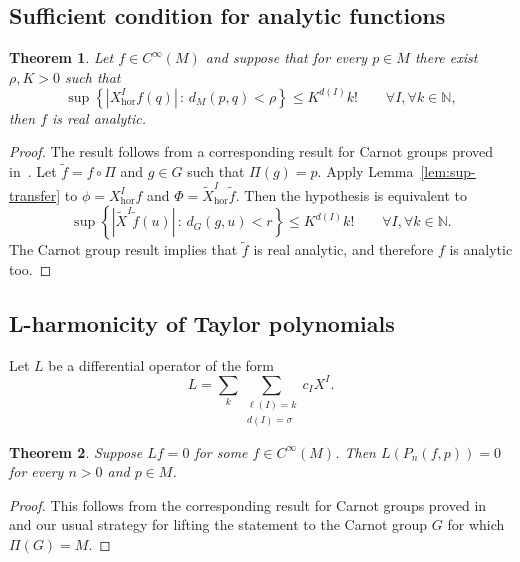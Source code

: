 \documentclass[12pt]{amsart}
\newtheorem{theorem}{Theorem}[section]
\begin{document}
\subsection{Sufficient condition for analytic functions}
\begin{theorem}
Let $f\in C^{\infty}(M)$ and suppose that for every $p\in M$ there exist $\rho,K>0$ such that
$$
\sup\left\{
|X_{\mathrm{hor}}^I f(q)|\,:\, d_M(p,q)<\rho
\right\}\leq K^{d(I)}k!\qquad \forall I,\forall k\in \mathbb N,
$$
then $f$ is real analytic.
\end{theorem}
\begin{proof}
 The result follows from a corresponding result for Carnot groups proved in~\cite{Bonfiglioli}.
       Let $\tilde f=f\circ\Pi$ and $g\in G$ such that $\Pi(g)=p$.
       Apply Lemma~\ref{lem:sup-transfer} to $\phi = X_{\mathrm{hor}}^I f$ and $\Phi = \tilde X_{\mathrm{hor}}^I \tilde f$.
      Then the hypothesis is equivalent to 
   $$
   \sup\left\{
|\tilde X^I \tilde f(u)|\,:\, d_G(g,u)<r
\right\}\leq K^{d(I)}k!\qquad \forall I,\forall k\in \mathbb N.
   $$
     The Carnot group result implies that $\tilde f$ is real analytic, and therefore $f$ is analytic too.
  
\end{proof}



\subsection{L-harmonicity of Taylor polynomials}
Let $L$ be a differential operator of the form
 $$
 L = \sum_{k} \sum_{\substack{\ell(I)=k\\d(I)=\sigma}} c_I  X^I.
 $$
\begin{theorem}
    Suppose $L f=0$ for some $f\in C^\infty (M)$. Then $L(P_n(f,p))=0$ for every $n>0$ and $p\in M$.
\end{theorem}
\begin{proof}
    This follows from the corresponding result for Carnot groups proved in~\cite{Bonfiglioli} and our usual strategy for lifting the statement to the Carnot group $G$ for which $\Pi(G)=M$. 
\end{proof}

\end{document}
